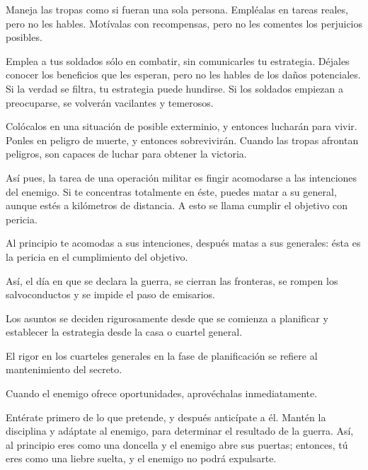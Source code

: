 Maneja las tropas como si fueran una sola persona. Empléalas en tareas reales, pero no les hables. Motívalas con recompensas, pero no les comentes los perjuicios posibles.

Emplea a tus soldados sólo en combatir, sin comunicarles tu estrategia. Déjales conocer los beneficios que les esperan, pero no les hables de los daños potenciales. Si la verdad se filtra, tu estrategia puede hundirse. Si los soldados empiezan a preocuparse, se volverán vacilantes y temerosos.

Colócalos en una situación de posible exterminio, y entonces lucharán para vivir. Ponles en peligro de muerte, y entonces sobrevivirán. Cuando las tropas afrontan peligros, son capaces de luchar para obtener la victoria.

Así pues, la tarea de una operación militar es fingir acomodarse a las intenciones del enemigo. Si te concentras totalmente en éste, puedes matar a su general, aunque estés a kilómetros de distancia. A esto se llama cumplir el objetivo con pericia.

Al principio te acomodas a sus intenciones, después matas a sus generales: ésta es la pericia en el cumplimiento del objetivo.

Así, el día en que se declara la guerra, se cierran las fronteras, se rompen los salvoconductos y se impide el paso de emisarios.

Los asuntos se deciden rigurosamente desde que se comienza a planificar y establecer la estrategia desde la casa o cuartel general.

El rigor en los cuarteles generales en la fase de planificación se refiere al mantenimiento del secreto.

Cuando el enemigo ofrece oportunidades, aprovéchalas inmediatamente.

Entérate primero de lo que pretende, y después anticípate a él. Mantén la disciplina y adáptate al enemigo, para determinar el resultado de la guerra. Así, al principio eres como una doncella y el enemigo abre sus puertas; entonces, tú eres como una liebre suelta, y el enemigo no podrá expulsarte.

